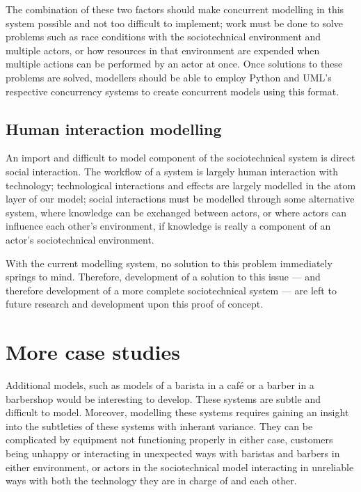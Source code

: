The combination of these two factors should make concurrent modelling in this system possible and not too difficult to implement; work must be done to solve problems such as race conditions with the sociotechnical environment and multiple actors, or how resources in that environment are expended when multiple actions can be performed by an actor at once. Once solutions to these problems are solved, modellers should be able to employ Python and UML's respective concurrency systems to create concurrent models using this format. \par 

\subsection{Human interaction modelling}
An import and difficult to model component of the sociotechnical system is direct social interaction. The workflow of a system is largely human interaction with technology; technological interactions and effects are largely modelled in the atom layer of our model; social interactions must be modelled through some alternative system, where knowledge can be exchanged between actors, or where actors can influence each other's environment, if knowledge is really a component of an actor's sociotechnical environment. \par 

With the current modelling system, no solution to this problem immediately springs to mind. Therefore, development of a solution to this issue --- and therefore development of a more complete sociotechnical system --- are left to future research and development upon this proof of concept. \par

\section{More case studies}
\label{more_case_studies}
Additional models, such as models of a barista in a café or a barber in a barbershop would be interesting to develop. These systems are subtle and difficult to model. Moreover, modelling these systems requires gaining an insight into the subtleties of these systems with inherant variance. They can be complicated by equipment not functioning properly in either case, customers being unhappy or interacting in unexpected ways with baristas and barbers in either environment, or actors in the sociotechnical model interacting in unreliable ways with both the technology they are in charge of and each other. \par

